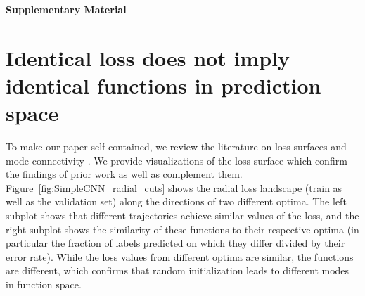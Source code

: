 \documentclass{article}
\begin{document}
%
%
%
%
%

%
%
%
%
%
%
%
%

%

%
%
%




%
%
%

%
%
%
%
%


\clearpage
\newpage

%
%



%

 \clearpage\newpage
 \appendix
 {\begin{center} {\Large{\textbf{Supplementary Material}}}
\end{center}}
%
 \setcounter{figure}{0}
\setcounter{table}{0}
\makeatletter 
\renewcommand{\thefigure}{S\@arabic\c@figure}
%
\renewcommand{\thetable}{S\@arabic\c@table}
\makeatother
 
%
%
%
%
%
%
%
%
%
%
%

\section{Identical loss does not imply identical functions in prediction space}
%
\label{sec:diversity-along-tunnel}
%
%
%
%
%
%
%
%
%
%
%
%
%
To make our paper self-contained, we review the literature on loss surfaces and mode connectivity \citep{garipov2018loss,draxler2018essentially,fort2019large}. We provide visualizations of the loss surface which confirm the findings of prior work as well as complement them.  
Figure~\ref{fig:SimpleCNN_radial_cuts} shows the radial loss landscape (train as well as the validation set) along the directions of two different optima. %
The left subplot shows that different trajectories achieve similar values of the loss, and the right subplot shows the similarity of these functions to their respective optima  (in particular the fraction of labels predicted on which they differ divided by their error rate). While the loss values from different optima are similar, the functions are different, which confirms that random initialization leads to different modes in function space. %
\end{document}
